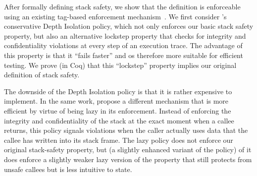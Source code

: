\documentclass[acmsmall,review,anonymous]{acmart}\settopmatter{printfolios=true,printccs=false,printacmref=false}
\begin{document}
After formally defining stack safety, we show that the definition is
enforceable using an existing tag-based enforcement
mechanism~\citep{DBLP:conf/sp/RoesslerD18}. We first consider
\citeauthor{DBLP:conf/sp/RoesslerD18}'s
conservative Depth Isolation policy, which not only enforces our basic
stack safety property, but also an alternative lockstep property that
checks for integrity and confidentiality violations at every step of
an execution trace. The advantage of this property is that it ``fails
faster'' and os therefore more suitable for efficient testing. We prove (in
Coq) that this ``lockstep'' property implies our original definition of stack
safety.

The downside of the Depth Isolation policy is that it is rather
expensive to implement. In the same work,
\citeauthor{DBLP:conf/sp/RoesslerD18} propose a different mechanism
that is more efficient by virtue of being lazy in its enforcement.
Instead of enforcing the integrity and confidentiality of the stack at the
exact moment
when a callee returns, this policy signals violations when the
caller actually uses data that the callee has written into  its stack
frame\ifaftersubmission{}\fi.
The lazy
policy does not enforce our original stack-safety property, but (a slightly
enhanced variant of the policy) of it does enforce a slightly weaker
lazy version of the property that still protects from unsafe callees but is
less intuitive to state.
\end{document}
